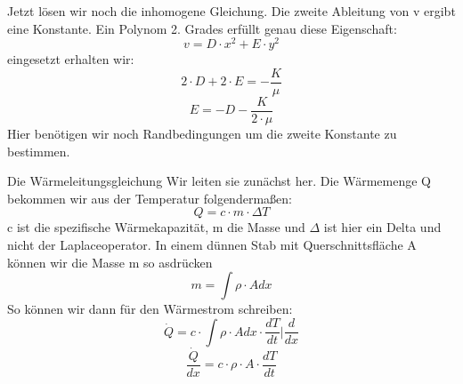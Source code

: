 \documentclass[
	11pt, %
]{beamer}
\begin{document}
\begin{frame}
	\begin{exampleblock}{}
		Jetzt l\"osen wir noch die inhomogene Gleichung. Die zweite Ableitung von v ergibt eine Konstante. Ein Polynom 2. Grades erf\"ullt genau diese Eigenschaft: 
		\begin{equation}
			v = D\cdot x^2 + E\cdot y^2
		\end{equation}
		eingesetzt erhalten wir:
		\begin{equation}
			2\cdot D+2\cdot E=-\frac{K}{\mu}
		\end{equation}
		\begin{equation}
			E=-D-\frac{K}{2\cdot\mu}
		\end{equation}
		Hier ben\"otigen wir noch Randbedingungen um die zweite Konstante zu bestimmen.
	\end{exampleblock}
\end{frame}
\begin{frame}
	\begin{exampleblock}{Die W\"armeleitungsgleichung}
		Wir leiten sie zun\"achst her. Die W\"armemenge Q bekommen wir aus der Temperatur folgenderma{\ss}en:
		\begin{equation}
			Q =  c\cdot m\cdot \Delta T
		\end{equation}
		c ist die spezifische W\"armekapazit\"at, m die Masse und $\Delta$ ist hier ein Delta und nicht der Laplaceoperator. In einem d\"unnen Stab mit Querschnittsfl\"ache A k\"onnen wir die Masse m so asdr\"ucken
		\begin{equation}
			m = \int \rho\cdot A  dx
		\end{equation}
		So k\"onnen wir dann f\"ur den W\"armestrom schreiben:
		\begin{equation}
			\dot{Q} = c\cdot\int \rho\cdot A  dx\cdot  \frac{dT}{dt} \big| \frac{d}{dx}
		\end{equation}
		\begin{equation}
			\frac{\dot{Q}}{dx} = c\cdot\rho\cdot A  \cdot \frac{dT}{dt}
		\end{equation}
	\end{exampleblock}
\end{frame}
\end{document}
